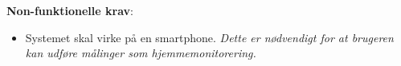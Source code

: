 \textbf{Non-funktionelle krav}:
\begin{itemize}
    \item Systemet skal virke på en smartphone.
    \textit{Dette er nødvendigt for at brugeren kan udføre målinger som hjemmemonitorering.}
\end{itemize}